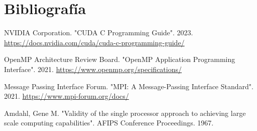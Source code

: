 \documentclass[12pt,a4paper]{article}
\begin{document}
	
	\newpage
	\section{Bibliografía}
	\begin{thebibliography}{9}
		 NVIDIA Corporation. "CUDA C Programming Guide". 2023. \url{https://docs.nvidia.com/cuda/cuda-c-programming-guide/}
		
		 OpenMP Architecture Review Board. "OpenMP Application Programming Interface". 2021. \url{https://www.openmp.org/specifications/}
		
		 Message Passing Interface Forum. "MPI: A Message-Passing Interface Standard". 2021. \url{https://www.mpi-forum.org/docs/}
		
		 Amdahl, Gene M. "Validity of the single processor approach to achieving large scale computing capabilities". AFIPS Conference Proceedings. 1967.
		
	\end{thebibliography}
	
	
\end{document}
